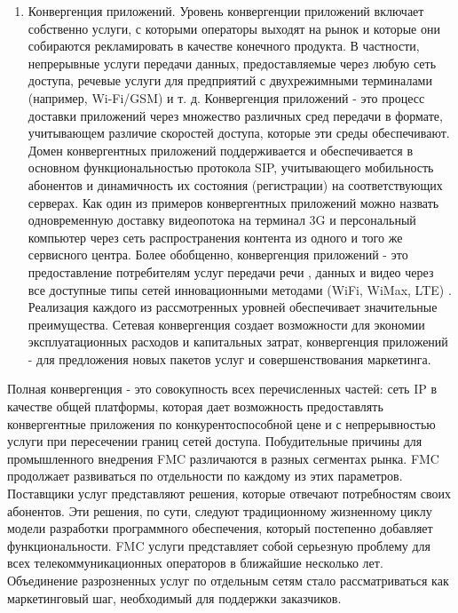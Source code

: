 \begin{enumerate}
\item Конвергенция приложений. Уровень конвергенции приложений включает собственно услуги, с которыми операторы выходят на рынок и которые они собираются рекламировать в качестве конечного продукта. В частности, непрерывные услуги передачи данных, предоставляемые через любую сеть доступа, речевые услуги для предприятий с двухрежимными терминалами (например, Wi-Fi/GSM) и т. д. Конвергенция приложений - это процесс доставки приложений через множество различных сред передачи в формате, учитывающем различие скоростей доступа, которые эти среды обеспечивают. Домен конвергентных приложений поддерживается и обеспечивается в основном функциональностью протокола SIP, учитывающего мобильность абонентов и динамичность их состояния (регистрации) на соответствующих серверах. Как один из примеров конвергентных приложений можно назвать одновременную доставку видеопотока на терминал 3G и персональный компьютер через сеть распространения контента из одного и того же сервисного центра. Более обобщенно, конвергенция приложений - это предоставление потребителям услуг передачи речи , данных и видео через все доступные типы сетей инновационными методами (WiFi, WiMax, LTE) . Реализация каждого из рассмотренных уровней обеспечивает значительные преимущества. Сетевая конвергенция создает возможности для экономии эксплуатационных расходов и капитальных затрат, конвергенция приложений - для предложения новых пакетов услуг и совершенствования маркетинга.

\end{enumerate}

Полная конвергенция - это совокупность всех перечисленных частей: сеть IP в качестве общей платформы, которая дает возможность предоставлять конвергентные приложения по конкурентоспособной цене и с непрерывностью услуги при пересечении границ сетей доступа. Побудительные причины для промышленного внедрения FMC различаются в разных сегментах рынка. FMC продолжает развиваться по отдельности по каждому из этих параметров. Поставщики услуг представляют решения, которые отвечают потребностям своих абонентов. Эти решения, по сути, следуют традиционному жизненному циклу модели разработки программного обеспечения, который постепенно добавляет функциональности.
FMC услуги представляет собой серьезную проблему для всех телекоммуникационных операторов в ближайшие несколько лет. Объединение разрозненных услуг по отдельным сетям стало рассматриваться как маркетинговый шаг, необходимый для поддержки заказчиков.









